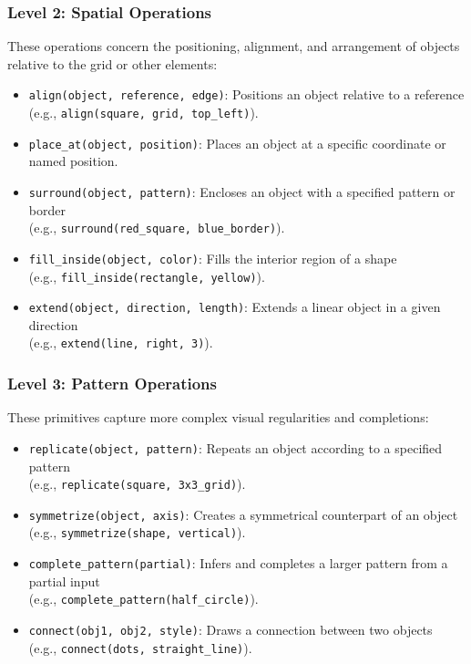 \documentclass[12pt]{article}
\begin{document}
\subsubsection{Level 2: Spatial Operations}
These operations concern the positioning, alignment, and arrangement of objects relative to the grid or other elements:
\begin{itemize}[noitemsep,topsep=0pt]
  \item \texttt{align(object, reference, edge)}: Positions an object relative to a reference \\(e.g., \texttt{align(square, grid, top\_left)}).
  \item \texttt{place\_at(object, position)}: Places an object at a specific coordinate or named position.
  \item \texttt{surround(object, pattern)}: Encloses an object with a specified pattern or border\\ (e.g., \texttt{surround(red\_square, blue\_border)}).
  \item \texttt{fill\_inside(object, color)}: Fills the interior region of a shape \\(e.g., \texttt{fill\_inside(rectangle, yellow)}).
  \item \texttt{extend(object, direction, length)}: Extends a linear object in a given direction \\(e.g., \texttt{extend(line, right, 3)}).
\end{itemize}

\subsubsection{Level 3: Pattern Operations}
These primitives capture more complex visual regularities and completions:
\begin{itemize}[noitemsep,topsep=0pt]
  \item \texttt{replicate(object, pattern)}: Repeats an object according to a specified pattern \\(e.g., \texttt{replicate(square, 3x3\_grid)}).
  \item \texttt{symmetrize(object, axis)}: Creates a symmetrical counterpart of an object \\(e.g., \texttt{symmetrize(shape, vertical)}).
  \item \texttt{complete\_pattern(partial)}: Infers and completes a larger pattern from a partial input \\(e.g., \texttt{complete\_pattern(half\_circle)}).
  \item \texttt{connect(obj1, obj2, style)}: Draws a connection between two objects \\(e.g., \texttt{connect(dots, straight\_line)}).
\end{itemize}
\end{document}
